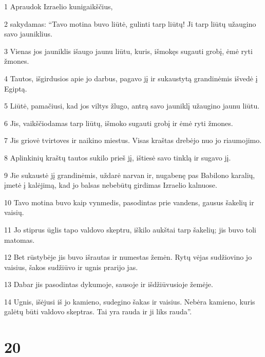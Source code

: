 \par 1 Apraudok Izraelio kunigaikščius, 
\par 2 sakydamas: “Tavo motina buvo liūtė, gulinti tarp liūtų! Ji tarp liūtų užaugino savo jauniklius. 
\par 3 Vienas jos jauniklis išaugo jaunu liūtu, kuris, išmokęs sugauti grobį, ėmė ryti žmones. 
\par 4 Tautos, išgirdusios apie jo darbus, pagavo jį ir sukaustytą grandinėmis išvedė į Egiptą. 
\par 5 Liūtė, pamačiusi, kad jos viltys žlugo, antrą savo jauniklį užaugino jaunu liūtu. 
\par 6 Jis, vaikščiodamas tarp liūtų, išmoko sugauti grobį ir ėmė ryti žmones. 
\par 7 Jis griovė tvirtoves ir naikino miestus. Visas kraštas drebėjo nuo jo riaumojimo. 
\par 8 Aplinkinių kraštų tautos sukilo prieš jį, ištiesė savo tinklą ir sugavo jį. 
\par 9 Jie sukaustė jį grandinėmis, uždarė narvan ir, nugabenę pas Babilono karalių, įmetė į kalėjimą, kad jo balsas nebebūtų girdimas Izraelio kalnuose. 
\par 10 Tavo motina buvo kaip vynmedis, pasodintas prie vandens, gausus šakelių ir vaisių. 
\par 11 Jo stiprus ūglis tapo valdovo skeptru, iškilo aukštai tarp šakelių; jis buvo toli matomas. 
\par 12 Bet rūstybėje jis buvo išrautas ir numestas žemėn. Rytų vėjas sudžiovino jo vaisius, šakos sudžiūvo ir ugnis prarijo jas. 
\par 13 Dabar jis pasodintas dykumoje, sausoje ir išdžiūvusioje žemėje. 
\par 14 Ugnis, išėjusi iš jo kamieno, sudegino šakas ir vaisius. Nebėra kamieno, kuris galėtų būti valdovo skeptras. Tai yra rauda ir ji liks rauda”.



\chapter{20}


